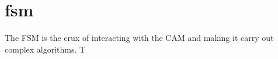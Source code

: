\section{fsm}
The FSM is the crux of interacting with the CAM and making it carry out complex algorithms. T